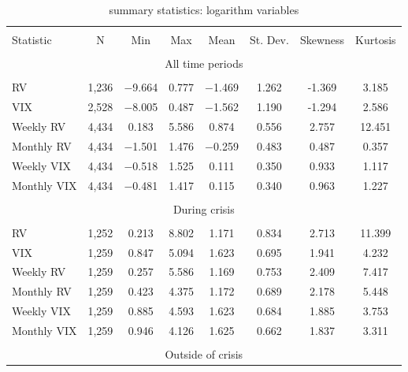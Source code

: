 \begin{table}[!htbp] \centering 
  \caption{summary statistics: logarithm variables} 
  \label{tab:summary2} 
\begin{tabular}{@{\extracolsep{5pt}}lccccccc} 
\\[-1.8ex]\hline 
\hline \\[-1.8ex] 
Statistic & \multicolumn{1}{c}{N} & \multicolumn{1}{c}{Min} & \multicolumn{1}{c}{Max} & \multicolumn{1}{c}{Mean} & \multicolumn{1}{c}{St. Dev.} & \multicolumn{1}{c}{Skewness} & \multicolumn{1}{c}{Kurtosis} \\ 
\hline \\[-1.8ex] 
\multicolumn{8}{c}{All time periods} \\
\hline \\[-1.8ex] 
RV & 1,236 & $-$9.664 & 0.777 & $-$1.469 & 1.262 & -1.369 & 3.185 \\ 
VIX & 2,528 & $-$8.005 & 0.487 & $-$1.562 & 1.190 & -1.294 & 2.586\\ 
Weekly RV & 4,434 & 0.183 & 5.586 & 0.874 & 0.556  &  2.757 & 12.451\\ 
Monthly RV & 4,434 & $-$1.501 & 1.476 & $-$0.259 & 0.483 &  0.487 & 0.357  \\ 
Weekly VIX & 4,434 & $-$0.518 & 1.525 & 0.111 & 0.350 & 0.933 &  1.117  \\ 
Monthly VIX & 4,434 & $-$0.481 & 1.417 & 0.115 & 0.340 &  0.963 &   1.227\\ 
\hline \\[-1.8ex] 
\multicolumn{8}{c}{During crisis} \\
\hline \\[-1.8ex] 
RV & 1,252 & 0.213 & 8.802 & 1.171 & 0.834 & 2.713 & 11.399\\ 
VIX & 1,259 & 0.847 & 5.094 & 1.623 & 0.695 & 1.941 & 4.232 \\ 
Weekly RV & 1,259 & 0.257 & 5.586 & 1.169 & 0.753 &  2.409 & 7.417 \\ 
Monthly RV & 1,259 & 0.423 & 4.375 & 1.172 & 0.689 & 2.178 & 5.448\\ 
Weekly VIX & 1,259 & 0.885 & 4.593 & 1.623 & 0.684 &  1.885 &  3.753\\ 
Monthly VIX & 1,259 & 0.946 & 4.126 & 1.625 & 0.662 &  1.837 &  3.311\\ 
\hline \\[-1.8ex] 
\multicolumn{8}{c}{Outside of crisis} \\                           

\end{tabular}
\end{table}
